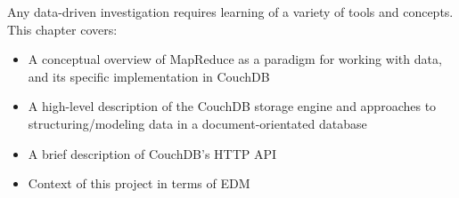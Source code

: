 Any data-driven investigation requires learning of a variety of tools and concepts. This chapter covers:

\begin{itemize}
    \item A conceptual overview of MapReduce as a paradigm for working with data, and its specific implementation in CouchDB
    \item A high-level description of the CouchDB storage engine and approaches to structuring/modeling data in a document-orientated database
    \item A brief description of CouchDB's HTTP API
    \item Context of this project in terms of EDM
\end{itemize}